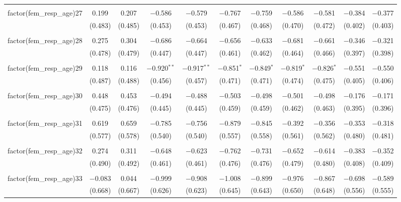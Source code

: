 \begin{table}[!htbp]
\begin{tabular}{@{\extracolsep{5pt}}lcccccccccc}
  & & & & & & & & & & \\ 
 factor(fem\_resp\_age)27 & 0.199 & 0.207 & $-$0.586 & $-$0.579 & $-$0.767 & $-$0.759 & $-$0.586 & $-$0.581 & $-$0.384 & $-$0.377 \\ 
  & (0.483) & (0.485) & (0.453) & (0.453) & (0.467) & (0.468) & (0.470) & (0.472) & (0.402) & (0.403) \\ 
  & & & & & & & & & & \\ 
 factor(fem\_resp\_age)28 & 0.275 & 0.304 & $-$0.686 & $-$0.664 & $-$0.656 & $-$0.633 & $-$0.681 & $-$0.661 & $-$0.346 & $-$0.321 \\ 
  & (0.478) & (0.479) & (0.447) & (0.447) & (0.461) & (0.462) & (0.464) & (0.466) & (0.397) & (0.398) \\ 
  & & & & & & & & & & \\ 
 factor(fem\_resp\_age)29 & 0.118 & 0.116 & $-$0.920$^{**}$ & $-$0.917$^{**}$ & $-$0.851$^{*}$ & $-$0.849$^{*}$ & $-$0.819$^{*}$ & $-$0.826$^{*}$ & $-$0.551 & $-$0.550 \\ 
  & (0.487) & (0.488) & (0.456) & (0.457) & (0.471) & (0.471) & (0.474) & (0.475) & (0.405) & (0.406) \\ 
  & & & & & & & & & & \\ 
 factor(fem\_resp\_age)30 & 0.448 & 0.453 & $-$0.494 & $-$0.488 & $-$0.503 & $-$0.498 & $-$0.501 & $-$0.498 & $-$0.176 & $-$0.171 \\ 
  & (0.475) & (0.476) & (0.445) & (0.445) & (0.459) & (0.459) & (0.462) & (0.463) & (0.395) & (0.396) \\ 
  & & & & & & & & & & \\ 
 factor(fem\_resp\_age)31 & 0.619 & 0.659 & $-$0.785 & $-$0.756 & $-$0.879 & $-$0.845 & $-$0.392 & $-$0.356 & $-$0.353 & $-$0.318 \\ 
  & (0.577) & (0.578) & (0.540) & (0.540) & (0.557) & (0.558) & (0.561) & (0.562) & (0.480) & (0.481) \\ 
  & & & & & & & & & & \\ 
 factor(fem\_resp\_age)32 & 0.274 & 0.311 & $-$0.648 & $-$0.623 & $-$0.762 & $-$0.731 & $-$0.652 & $-$0.614 & $-$0.383 & $-$0.352 \\ 
  & (0.490) & (0.492) & (0.461) & (0.461) & (0.476) & (0.476) & (0.479) & (0.480) & (0.408) & (0.409) \\ 
  & & & & & & & & & & \\ 
 factor(fem\_resp\_age)33 & $-$0.083 & 0.044 & $-$0.999 & $-$0.908 & $-$1.008 & $-$0.899 & $-$0.976 & $-$0.867 & $-$0.698 & $-$0.589 \\ 
  & (0.668) & (0.667) & (0.626) & (0.623) & (0.645) & (0.643) & (0.650) & (0.648) & (0.556) & (0.555) \\ 

\end{tabular}
\end{table}
